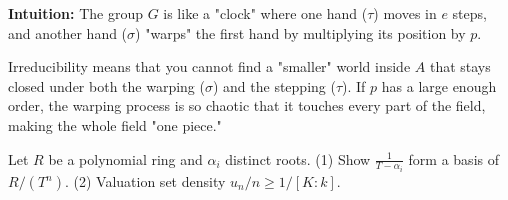 \begin{solution}
\textbf{Intuition:}
The group $G$ is like a "clock" where one hand ($\tau$) moves in $e$ steps, and another hand ($\sigma$) "warps" the first hand by multiplying its position by $p$. 

Irreducibility means that you cannot find a "smaller" world inside $A$ that stays closed under both the warping ($\sigma$) and the stepping ($\tau$). If $p$ has a large enough order, the warping process is so chaotic that it touches every part of the field, making the whole field "one piece."

\end{solution}

\begin{exercise}
\label{algebra:2025:3}
Let $R$ be a polynomial ring and $\alpha_i$ distinct roots. 
(1) Show $\frac{1}{T-\alpha_i}$ form a basis of $R/(T^n)$.
(2) Valuation set density $u_n/n \geq 1/[K:k]$.
\end{exercise}

